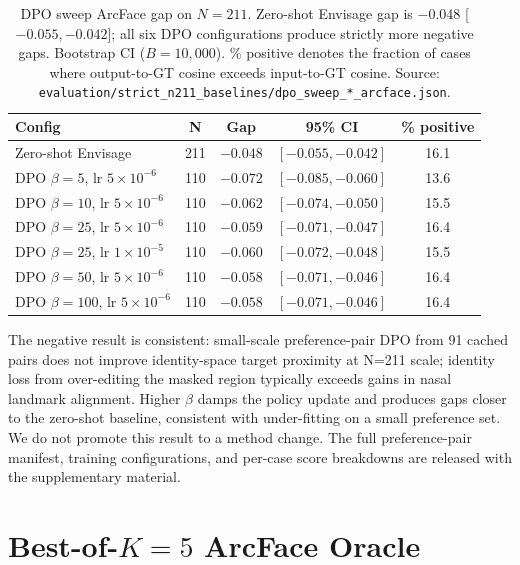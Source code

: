 \documentclass{article}
\begin{document}
\begin{table}[h]
\centering
\small
\caption{DPO sweep ArcFace gap on $N{=}211$. Zero-shot Envisage gap is
$-0.048$ [$-0.055, -0.042$]; all six DPO configurations produce strictly more
negative gaps. Bootstrap CI ($B{=}10{,}000$). \% positive denotes the fraction
of cases where output-to-GT cosine exceeds input-to-GT cosine. Source:
\texttt{evaluation/strict\_n211\_baselines/dpo\_sweep\_*\_arcface.json}.}
\label{tab:dpo_sweep}
\begin{tabular}{@{}lcccc@{}}
\toprule
\textbf{Config} & \textbf{N} & \textbf{Gap} & \textbf{95\% CI} & \textbf{\% positive} \\
\midrule
Zero-shot Envisage              & 211 & $-0.048$ & $[-0.055, -0.042]$ & 16.1 \\
\midrule
DPO $\beta{=}5$, lr $5{\times}10^{-6}$    & 110 & $-0.072$ & $[-0.085, -0.060]$ & 13.6 \\
DPO $\beta{=}10$, lr $5{\times}10^{-6}$   & 110 & $-0.062$ & $[-0.074, -0.050]$ & 15.5 \\
DPO $\beta{=}25$, lr $5{\times}10^{-6}$   & 110 & $-0.059$ & $[-0.071, -0.047]$ & 16.4 \\
DPO $\beta{=}25$, lr $1{\times}10^{-5}$   & 110 & $-0.060$ & $[-0.072, -0.048]$ & 15.5 \\
DPO $\beta{=}50$, lr $5{\times}10^{-6}$   & 110 & $-0.058$ & $[-0.071, -0.046]$ & 16.4 \\
DPO $\beta{=}100$, lr $5{\times}10^{-6}$  & 110 & $-0.058$ & $[-0.071, -0.046]$ & 16.4 \\
\bottomrule
\end{tabular}
\end{table}

\noindent The negative result is consistent: small-scale preference-pair DPO
from 91 cached pairs does not improve identity-space target proximity at
N=211 scale; identity loss from over-editing the masked region
typically exceeds gains in nasal landmark alignment. Higher $\beta$ damps
the policy update and produces gaps closer to the zero-shot baseline,
consistent with under-fitting on a small preference set. We do not promote
this result to a method change. The full preference-pair manifest, training
configurations, and per-case score breakdowns are released with the
supplementary material.

\section{Best-of-$K{=}5$ ArcFace Oracle}
\label{app:best_of_k}
\end{document}
